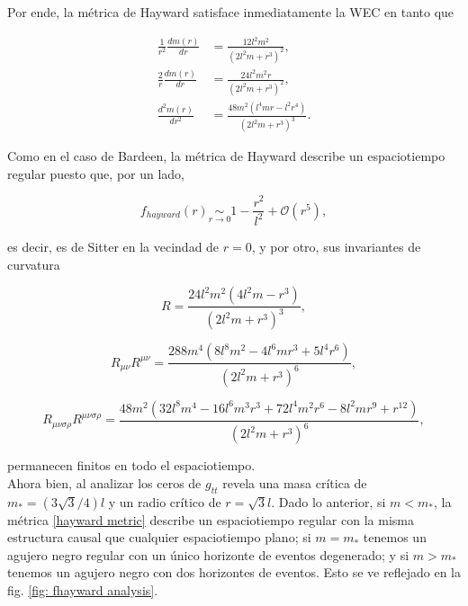 \documentclass{article}
\numberwithin{equation}{section}
\theoremstyle{definition}
\begin{document}
Por ende, la métrica de Hayward satisface inmediatamente la WEC en tanto que 

\begin{align}
\frac{1}{r^2}\frac{dm(r)}{dr} &= \frac{12 l^2 m^2}{\left(2 l^2 m+r^3\right)^2},\\
\frac{2}{r}\frac{dm(r)}{dr} &= \frac{24 l^2 m^2 r}{\left(2 l^2 m+r^3\right)^2},\\
\frac{d^2m(r)}{dr^2} &= \frac{48 m^2 \left(l^4 m r-l^2 r^4\right)}{\left(2 l^2 m+r^3\right)^3}.
\end{align}

Como en el caso de Bardeen, la métrica de Hayward describe un espaciotiempo regular puesto que, por un lado, 

\begin{equation}
f_{hayward}(r) \underset{r \to 0}{\sim} 1 - \frac{r^2}{l^2} + \mathcal{O}(r^5),
\end{equation}

es decir, es de Sitter en la vecindad de $r =0$, y por otro, sus invariantes de curvatura

\begin{equation}
\label{hayward scalar}
R = \frac{24 l^2 m^2 \left(4 l^2 m-r^3\right)}{\left(2 l^2 m+r^3\right)^3},
\end{equation}

\begin{equation}
\label{hayward ricci scalar}
R_{\mu \nu}R^{\mu \nu} = \frac{288 m^4 \left(8 l^8 m^2-4 l^6 m r^3+5 l^4 r^6\right)}{\left(2 l^2 m+r^3\right)^6},
\end{equation}

\begin{equation}
\label{hayward riemann scalar}
R_{\mu \nu \sigma \rho}R^{\mu \nu \sigma \rho} = \frac{48 m^2 \left(32 l^8 m^4-16 l^6 m^3 r^3+72 l^4 m^2 r^6-8 l^2 m r^9+r^{12}\right)}{\left(2 l^2 m+r^3\right)^6},
\end{equation}

permanecen finitos en todo el espaciotiempo.\\

Ahora bien, al analizar los ceros de $g_{tt}$ revela una masa crítica de $m_{*} = (3\sqrt{3}/4)l$ y un radio crítico de $r = \sqrt{3}l$. Dado lo anterior, si $m < m_{*}$, la métrica \ref{hayward metric} describe un espaciotiempo regular con la misma estructura causal que cualquier espaciotiempo plano; si $m = m_{*}$ tenemos un agujero negro regular con un único horizonte de eventos degenerado; y si $m > m_{*}$ tenemos un agujero negro con dos horizontes de eventos. Esto se ve reflejado en la fig. \ref{fig: fhayward analysis}. 
\end{document}
